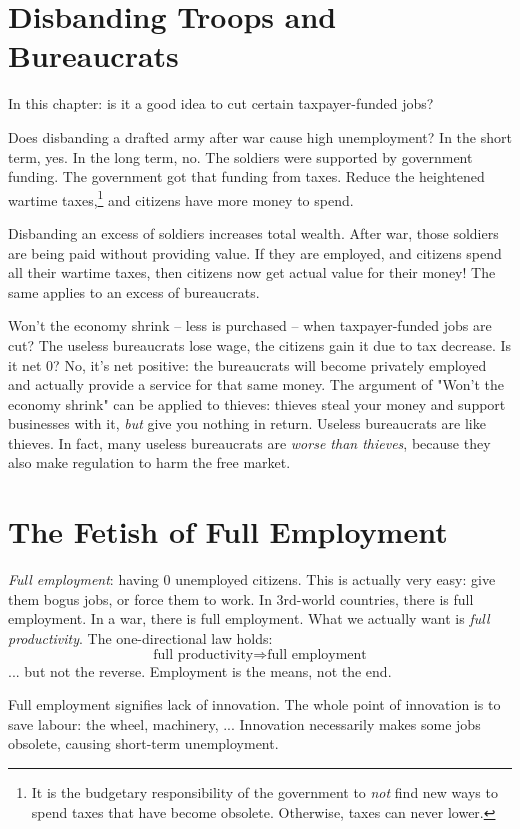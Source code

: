\section{Disbanding Troops and Bureaucrats}
\begin{outline}
\1 In this chapter: is it a good idea to cut certain taxpayer-funded jobs?

\1 Does disbanding a drafted army after war cause high unemployment?
	\2 In the short term, yes.
	\2 In the long term, no.
		\3 The soldiers were supported by government funding.
		\3 The government got that funding from taxes.
		\3 Reduce the heightened wartime taxes,\footnote{It is the budgetary responsibility of the government to \emph{not} find new ways to spend taxes that have become obsolete. Otherwise, taxes can never lower.} and citizens have more money to spend.
		
\1 Disbanding an excess of soldiers increases total wealth.
	\2 After war, those soldiers are being paid without providing value.
	\2 If they are employed, and citizens spend all their wartime taxes, then citizens now get actual value for their money!
	\2 The same applies to an excess of bureaucrats.
	
\1 Won't the economy shrink -- less is purchased -- when taxpayer-funded jobs are cut?
	\2 The useless bureaucrats lose wage, the citizens gain it due to tax decrease.
	\2 Is it net $0$? No, it's net positive: the bureaucrats will become privately employed and actually provide a service for that same money.
	\2 The argument of "Won't the economy shrink" can be applied to thieves: thieves steal your money and support businesses with it, \emph{but} give you nothing in return. Useless bureaucrats are like thieves.
	\2 In fact, many useless bureaucrats are \emph{worse than thieves}, because they also make regulation to harm the free market.
\end{outline}

\section{The Fetish of Full Employment}
\begin{outline}
\1 \emph{Full employment}: having $0$ unemployed citizens. 
	\2 This is actually very easy: give them bogus jobs, or force them to work.
		\3 In 3rd-world countries, there is full employment.
		\3 In a war, there is full employment.
	\2 What we actually want is \emph{full productivity}. The one-directional law holds:
	\begin{equation}
		\text{full productivity} \Rightarrow  \text{full employment}
	\end{equation}
	... but not the reverse. Employment is the means, not the end.
	
\1 Full employment signifies lack of innovation.
	\2 The whole point of innovation is to save labour: the wheel, machinery, ...
	\2 Innovation necessarily makes some jobs obsolete, causing short-term unemployment.
\end{outline}

